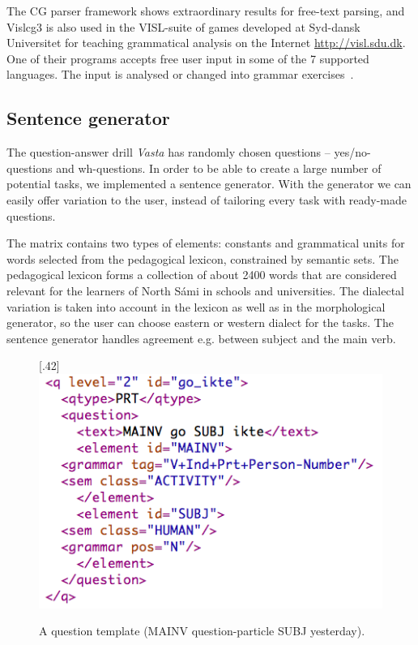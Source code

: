 \documentclass[11pt]{article}
\begin{document}
The CG parser framework shows extraordinary results for free-text parsing, and Vislcg3 is also used in the VISL-suite of games developed at Syd-dansk Universitet for teaching grammatical analysis on the Internet \url{http://visl.sdu.dk}. One of their  programs accepts free user input in some of the 7 supported languages. The input is analysed or changed into grammar exercises~\cite{Bick:05}.

\subsection{Sentence generator}
The question-answer drill \textit{Vasta} has randomly chosen questions -- yes/no-questions and wh-questions. In order to be able to create a large number of potential tasks, we implemented a sentence generator. With the generator we can easily offer variation to the user, instead of tailoring every task with ready-made questions.

The matrix contains two types of elements: constants and grammatical units for words selected from the pedagogical lexicon, constrained by semantic sets. The pedagogical lexicon forms a collection of about 2400 words that are considered relevant for the learners of North Sámi in schools and universities. The dialectal variation is taken into account in the lexicon as well as in the morphological generator, so the user can choose eastern or western dialect for the tasks. The sentence generator handles agreement e.g. between subject and the main verb. \\ 

\begin{figure}[htbp]
\begin{center}
\scalebox{.42}[.42]{\includegraphics{presentation/img/sentencegenerator.png}}\\
\caption{A question template (MAINV question-particle SUBJ yesterday).}
\label{sentgen}
\end{center}
\end{figure}
\end{document}
